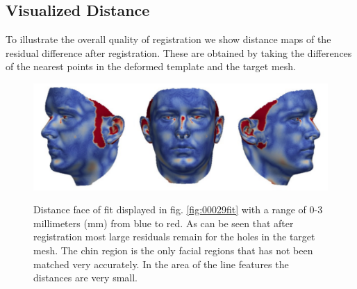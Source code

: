 \subsection{Visualized Distance}
To illustrate the overall quality of registration we show distance maps of the residual difference after registration. These are obtained by taking the differences of the nearest points in the deformed template and the target mesh.
\begin{figure}[h!]
    \centering
    \includegraphics[width=.8\textwidth]{./resources/img/00029_distmap.pdf}
    \label{fig:00029distmap}
    \caption{Distance face of fit displayed in fig. \ref{fig:00029fit} with a range of 0-3 millimeters (mm) from blue to red. As can be seen that after registration most large residuals remain for the holes in the target mesh. The chin region is the only facial regions that has not been matched very accurately. In the area of the line features the distances are very small.}
\end{figure}

